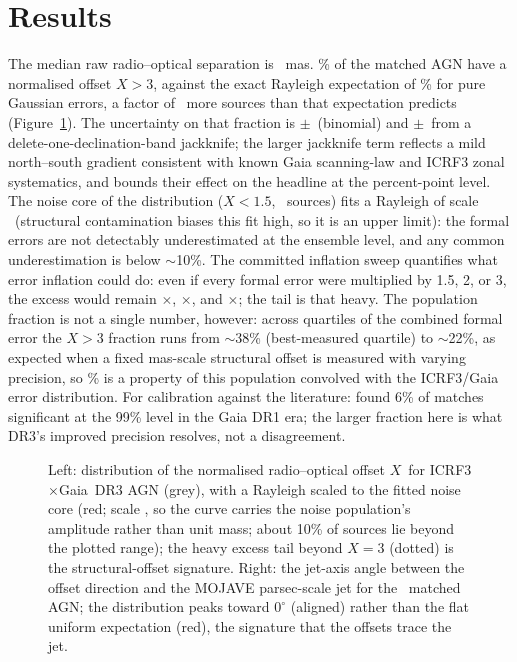 \documentclass[twocolumn]{aastex631}
\newcommand{\xnorm}{\ensuremath{X}}
\begin{document}
\section{Results}
The median raw radio--optical separation is \offMedian~mas. \offFracTail\% of the matched AGN
have a normalised offset $\xnorm>3$, against the exact Rayleigh expectation of \offRayleigh\% for
pure Gaussian errors, a factor of \offExcess\ more sources than that expectation predicts
(Figure~\ref{fig:xnorm}). The uncertainty on that fraction is $\pm$\offFracTailSe\ (binomial) and
$\pm$\offFracTailJkSe\ from a delete-one-declination-band jackknife; the larger jackknife term
reflects a mild north--south gradient consistent with known Gaia scanning-law and ICRF3 zonal
systematics, and bounds their effect on the headline at the percent-point level. The noise core of
the distribution ($\xnorm<1.5$, \offCoreN\ sources) fits a Rayleigh of scale \offCoreScale\
(structural contamination biases this fit high, so it is an upper limit): the formal errors are
not detectably underestimated at the ensemble level, and any common underestimation is below
$\sim$10\%. The committed inflation sweep quantifies what error inflation could do:
even if every formal error were multiplied by 1.5, 2, or 3, the excess would remain
\offInflOneFive$\times$, \offInflTwo$\times$, and \offInflThree$\times$; the tail is that
heavy. The population fraction is not a single number, however: across quartiles of the combined
formal error the $\xnorm>3$ fraction runs from $\sim$38\% (best-measured quartile) to $\sim$22\%,
as expected when a fixed mas-scale structural offset is measured with varying precision, so
\offFracTail\% is a property of this population convolved with the ICRF3/Gaia error
distribution. For calibration against the literature: \citet{petrovkovalev2017L} found 6\% of
matches significant at the 99\% level in the Gaia DR1 era; the larger fraction here is what DR3's
improved precision resolves, not a disagreement.

\begin{figure}
\caption{Left: distribution of the normalised radio--optical offset \xnorm\ for
ICRF3$\times$Gaia~DR3 AGN (grey), with a Rayleigh scaled to the fitted noise core (red; scale
\offCoreScale, so the curve carries the noise population's amplitude rather than unit mass;
about 10\% of sources lie beyond the plotted range); the heavy excess tail beyond $\xnorm=3$
(dotted) is the structural-offset signature.
Right: the jet-axis angle between the offset direction and the MOJAVE parsec-scale jet for the
\offJetN\ matched AGN; the distribution peaks toward $0^\circ$ (aligned) rather than the flat uniform
expectation (red), the signature that the offsets trace the jet.}
\label{fig:xnorm}
\end{figure}
\end{document}
